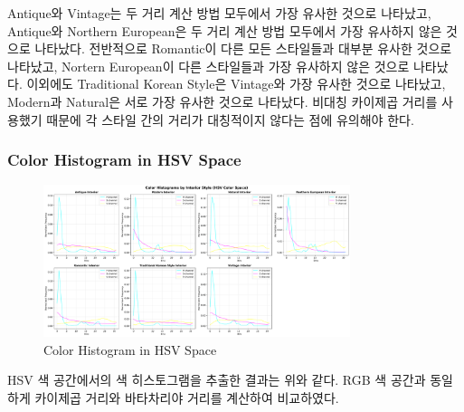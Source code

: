 \documentclass[11pt]{article}
\begin{document}
Antique와 Vintage는 두 거리 계산 방법 모두에서 가장 유사한 것으로 나타났고, Antique와 Northern European은 두 거리 계산 방법 모두에서 가장 유사하지 않은 것으로 나타났다.
전반적으로 Romantic이 다른 모든 스타일들과 대부분 유사한 것으로 나타났고, Nortern European이 다른 스타일들과 가장 유사하지 않은 것으로 나타났다.
이외에도 Traditional Korean Style은 Vintage와 가장 유사한 것으로 나타났고, Modern과 Natural은 서로 가장 유사한 것으로 나타났다.
비대칭 카이제곱 거리를 사용했기 때문에 각 스타일 간의 거리가 대칭적이지 않다는 점에 유의해야 한다.

\subsubsection{Color Histogram in HSV Space}
\begin{figure}[htbp]
    \centering
    \includegraphics[width=0.8\textwidth]{figures/hsv_color_histogram.pdf}
    \caption{Color Histogram in HSV Space}
    \label{fig:hsv_color_histogram}
\end{figure}
HSV 색 공간에서의 색 히스토그램을 추출한 결과는 위와 같다. RGB 색 공간과 동일하게 카이제곱 거리와 바타차리야 거리를 계산하여 비교하였다.
\end{document}
